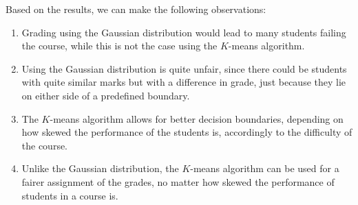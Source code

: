 Based on the results, we can make the following observations:
\begin{enumerate}
    \item Grading using the Gaussian distribution would lead to many students
    failing the course, while this is not the case using the $K$-means
    algorithm.
    \item Using the Gaussian distribution is quite unfair, since there could
    be students with quite similar marks but with a difference in grade, just
    because they lie on either side of a predefined boundary.
    \item The $K$-means algorithm allows for better decision boundaries,
    depending on how skewed the performance of the students is, accordingly
    to the difficulty of the course.
    \item Unlike the Gaussian distribution, the $K$-means algorithm can be
    used for a fairer assignment of the grades, no matter how skewed the 
    performance of students in a course is.
\end{enumerate}
